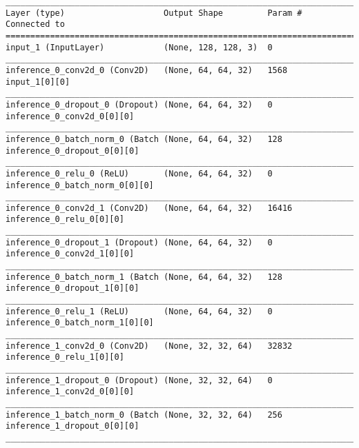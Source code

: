 \begin{lstlisting}[caption={CelebA-VLAE Encoder},captionpos=b,basicstyle=\tiny, label={lst:celeba-vlae-encoder}]
__________________________________________________________________________________________________
Layer (type)                    Output Shape         Param #     Connected to
==================================================================================================
input_1 (InputLayer)            (None, 128, 128, 3)  0
__________________________________________________________________________________________________
inference_0_conv2d_0 (Conv2D)   (None, 64, 64, 32)   1568        input_1[0][0]
__________________________________________________________________________________________________
inference_0_dropout_0 (Dropout) (None, 64, 64, 32)   0           inference_0_conv2d_0[0][0]
__________________________________________________________________________________________________
inference_0_batch_norm_0 (Batch (None, 64, 64, 32)   128         inference_0_dropout_0[0][0]
__________________________________________________________________________________________________
inference_0_relu_0 (ReLU)       (None, 64, 64, 32)   0           inference_0_batch_norm_0[0][0]
__________________________________________________________________________________________________
inference_0_conv2d_1 (Conv2D)   (None, 64, 64, 32)   16416       inference_0_relu_0[0][0]
__________________________________________________________________________________________________
inference_0_dropout_1 (Dropout) (None, 64, 64, 32)   0           inference_0_conv2d_1[0][0]
__________________________________________________________________________________________________
inference_0_batch_norm_1 (Batch (None, 64, 64, 32)   128         inference_0_dropout_1[0][0]
__________________________________________________________________________________________________
inference_0_relu_1 (ReLU)       (None, 64, 64, 32)   0           inference_0_batch_norm_1[0][0]
__________________________________________________________________________________________________
inference_1_conv2d_0 (Conv2D)   (None, 32, 32, 64)   32832       inference_0_relu_1[0][0]
__________________________________________________________________________________________________
inference_1_dropout_0 (Dropout) (None, 32, 32, 64)   0           inference_1_conv2d_0[0][0]
__________________________________________________________________________________________________
inference_1_batch_norm_0 (Batch (None, 32, 32, 64)   256         inference_1_dropout_0[0][0]
__________________________________________________________________________________________________

\end{lstlisting}
